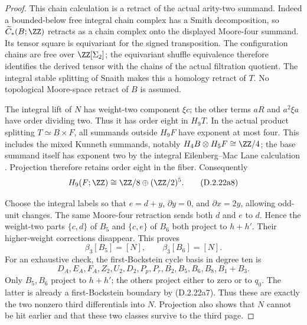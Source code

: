 \begin{proof}
This chain calculation is a retract of the actual arity-two
summand. Indeed a bounded-below free integral chain complex
has a Smith decomposition, so $\widetilde C_*(B;\ZZ)$ retracts
as a chain complex onto the displayed Moore-four summand.
Its tensor square is equivariant for the signed transposition.
The configuration chains are free over $\ZZ[\Sigma_2]$;
the equivariant shuffle equivalence therefore identifies the
derived tensor with the chains of the actual filtration quotient.
The integral stable splitting of Snaith
\cite[Theorem 1.1 and Section 2]{Snaith1974} makes this a
homology retract of $T$. No topological Moore-space retract
of $B$ is assumed.

The integral lift of $N$ has weight-two component $\xi c$;
the other terms $aR$ and $a^2\xi a$ have order dividing two.
Thus it has order eight in $H_9T$. In the actual product splitting
$T\simeq B\times F$, all summands outside $H_9F$ have exponent
at most four. This includes the mixed Kunneth summands, notably
$H_4B\otimes H_5F\cong\ZZ/4$; the base summand itself has
exponent two by the integral Eilenberg--Mac Lane calculation
\cite[\S3.2]{I_Clement2002}. Projection therefore retains order eight in the
fiber. Consequently
\[
 H_9(F;\ZZ)\cong\ZZ/8\oplus(\ZZ/2)^5.
 \tag{D.2.22a8}
\]

Choose the integral labels so that $e=d+y$, $\partial y=0$,
and $\partial x=2y$, allowing odd-unit changes. The same
Moore-four retraction sends both $d$ and $e$ to $d$.
Hence the weight-two parts $\{c,d\}$ of $B_5$ and
$\{c,e\}$ of $B_6$ both project to $h+h'$.
Their higher-weight corrections disappear. This proves
\[
 \beta_3[B_5]=[N],\qquad \beta_3[B_6]=[N].
 \tag{D.2.22a9}
\]
For an exhaustive check, the first-Bockstein cycle basis in
degree ten is
\[
 D_A,E_A,F_A,Z_2,U_2,D_2,P_p,P_r,
 B_2,B_5,B_6,B_8,B_1+B_3.
\]
Only $B_5,B_6$ project to $h+h'$; the others project either
to zero or to $q_0$. The latter is already a first-Bockstein
boundary by \textup{(D.2.22a7)}. Thus these are exactly the
two nonzero third differentials into $N$. Projection also
shows that $N$ cannot be hit earlier and that these two
classes survive to the third page.


\end{proof}
